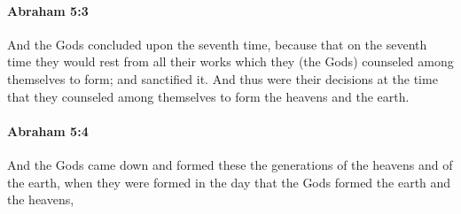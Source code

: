 
		\paragraph{Abraham 5:3} %
			\label{ABRAHAM-5-3}

			And the Gods concluded upon the seventh time, because that on the seventh time they would rest from all their works which they (the Gods) counseled among themselves to form; and sanctified it.  And thus were their decisions at the time that they counseled among themselves to form the heavens and the earth.


		\paragraph{Abraham 5:4} %
			\label{ABRAHAM-5-4}

			And the Gods came down and formed these the generations of the heavens and of the earth, when they were formed in the day that the Gods formed the earth and the heavens,

